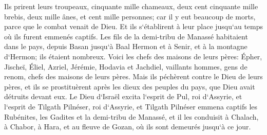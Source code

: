 \verse Ils prirent leurs troupeaux, cinquante mille chameaux, deux cent cinquante mille brebis, deux mille ânes, et cent mille personnes; 
\verse car il y eut beaucoup de morts, parce que le combat venait de Dieu. Et ils s`établirent à leur place jusqu`au temps où ils furent emmenés captifs. 
\verse Les fils de la demi-tribu de Manassé habitaient dans le pays, depuis Basan jusqu`à Baal Hermon et à Senir, et à la montagne d`Hermon; ils étaient nombreux. 
\verse Voici les chefs des maisons de leurs pères: Épher, Jischeï, Éliel, Azriel, Jérémie, Hodavia et Jachdiel, vaillants hommes, gens de renom, chefs des maisons de leurs pères. 
\verse Mais ils péchèrent contre le Dieu de leurs pères, et ils se prostituèrent après les dieux des peuples du pays, que Dieu avait détruits devant eux. 
\verse Le Dieu d`Israël excita l`esprit de Pul, roi d`Assyrie, et l`esprit de Tilgath Pilnéser, roi d`Assyrie, et Tilgath Pilnéser emmena captifs les Rubénites, les Gadites et la demi-tribu de Manassé, et il les conduisit à Chalach, à Chabor, à Hara, et au fleuve de Gozan, où ils sont demeurés jusqu`à ce jour. 

